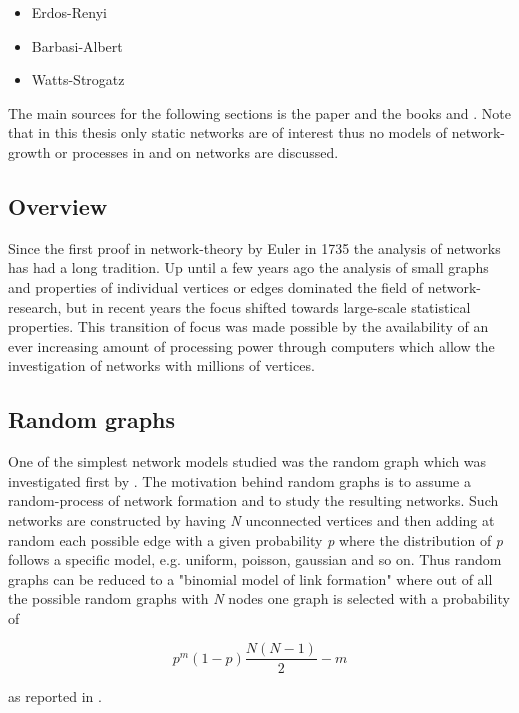 \documentclass[../Bachelorarbeit.tex]{subfiles}
\begin{document}
\begin{itemize}
\item Erdos-Renyi
\item Barbasi-Albert
\item Watts-Strogatz
\end{itemize}

The main sources for the following sections is the paper \cite{Newman_ComplexNetworks} and the books \cite{Jackson2008} and \cite{Easley2010}. Note that in this thesis only static networks are of interest thus no models of network-growth or processes in and on networks are discussed.

\subsection{Overview}
Since the first proof in network-theory by Euler in 1735 the analysis of networks has had a long tradition. Up until a few years ago the analysis of small graphs and properties of individual vertices or edges dominated the field of network-research, but in recent years the focus shifted towards large-scale statistical properties. This transition of focus was made possible by the availability of an ever increasing amount of processing power through computers which allow the investigation of networks with millions of vertices.

\subsection{Random graphs}
One of the simplest network models studied was the random graph which was investigated first by \cite{ErdosRenyi1959}. The motivation behind random graphs is to assume a random-process of network formation and to study the resulting networks. Such networks are constructed by having \textit{N} unconnected vertices and then adding at random each possible edge with a given probability \textit{p} where the distribution of \textit{p} follows a specific model, e.g. uniform, poisson, gaussian and so on. Thus random graphs can be reduced to a "binomial model of link formation" \cite{Jackson2008} where out of all the possible random graphs with \textit{N} nodes one graph is selected with a probability of 

\begin{equation}
p^m(1-p) \frac{N(N-1)}{2} - m
\end{equation}

as reported in \cite{Jackson2008}.
\end{document}
